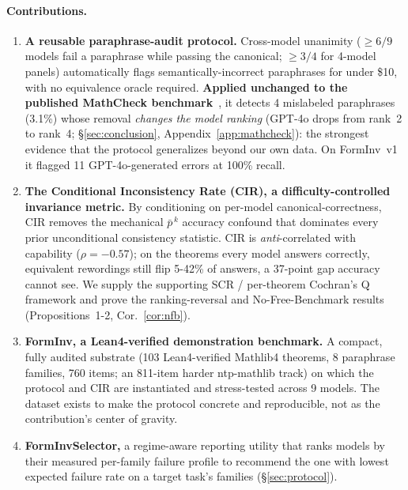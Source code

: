 \documentclass{article}
\begin{document}
\paragraph{Contributions.}
\begin{enumerate}[leftmargin=*,itemsep=2pt]
\item \textbf{A reusable paraphrase-audit protocol.}
Cross-model unanimity ($\geq 6/9$ models fail a paraphrase while passing the canonical;
$\geq 3/4$ for 4-model panels) automatically flags semantically-incorrect paraphrases for
under \$10, with no equivalence oracle required.
\textbf{Applied unchanged to the published MathCheck benchmark}~\citep{zhou2024mathcheck},
it detects 4 mislabeled paraphrases (3.1\%) whose removal \emph{changes the model
ranking} (GPT-4o drops from rank~2 to rank~4; \S\ref{sec:conclusion},
Appendix~\ref{app:mathcheck}): the strongest evidence that the protocol generalizes
beyond our own data. On FormInv~v1 it flagged 11 GPT-4o-generated errors at 100\% recall.

\item \textbf{The Conditional Inconsistency Rate (CIR), a difficulty-controlled invariance metric.}
By conditioning on per-model canonical-correctness, CIR removes the mechanical $\bar p^{\,k}$
accuracy confound that dominates every prior unconditional consistency statistic. CIR is
\emph{anti}-correlated with capability ($\rho=-0.57$); on the theorems every model answers
correctly, equivalent rewordings still flip 5-42\% of answers, a 37-point gap accuracy
cannot see. We supply the supporting SCR / per-theorem Cochran's Q framework and prove the
ranking-reversal and No-Free-Benchmark results (Propositions~1-2, Cor.~\ref{cor:nfb}).

\item \textbf{FormInv, a Lean4-verified demonstration benchmark.}
A compact, fully audited substrate (103 Lean4-verified Mathlib4 theorems, 8 paraphrase
families, 760 items; an 811-item harder ntp-mathlib track) on which the protocol and CIR are
instantiated and stress-tested across 9 models. The dataset exists to make the protocol
concrete and reproducible, not as the contribution's center of gravity.

\item \textbf{FormInvSelector,} a regime-aware reporting utility that ranks models by their
measured per-family failure profile to recommend the one with lowest expected failure rate on
a target task's families (\S\ref{sec:protocol}).
\end{enumerate}
\end{document}
